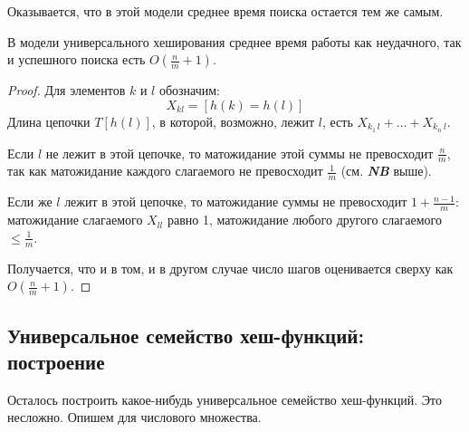 Оказывается, что в этой модели среднее время поиска остается тем же самым.

\begin{theorem*}
	В модели универсального хеширования среднее время работы как неудачного, так и успешного поиска есть $O\left(\frac{n}{m}+1\right)$.
\end{theorem*}
\begin{proof}
Для элементов $k$ и $l$ обозначим:
$$X_{kl} = [h(k) = h(l)]$$
Длина цепочки $T[h(l)]$, в которой, возможно, лежит $l$, есть $X_{k_1\, l} + \ldots + X_{k_n\ l}$.

Если $l$ не лежит в этой цепочке, то матожидание этой суммы не превосходит $\frac{n}{m}$, так как матожидание каждого слагаемого не превосходит $\frac{1}{m}$ (см. \textit{\textbf{NB}} выше).

Если же $l$ лежит в этой цепочке, то матожидание суммы не превосходит $1 + \frac{n-1}{m}$: матожидание слагаемого $X_{ll}$ равно 1, матожидание любого другого слагаемого $\leq \frac{1}{m}$.

Получается, что и в том, и в другом случае число шагов оценивается сверху как $O\left(\frac{n}{m}+1\right)$.
\end{proof}

\subsection{Универсальное семейство хеш-функций: построение}
Осталось построить какое-нибудь универсальное семейство хеш-функций. Это несложно. Опишем для числового множества.

